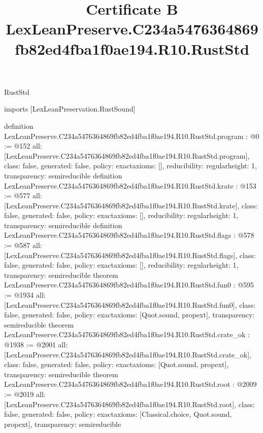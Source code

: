 \begin{lexlean}{RustStd}
\title{Certificate B LexLeanPreserve.C234a5476364869fb82ed4fba1f0ae194.R10.RustStd}
\begin{coremodule}
imports [LexLeanPreservation.RustSound]

definition LexLeanPreserve.C234a5476364869fb82ed4fba1f0ae194.R10.RustStd.program : @0 := @152 {
  all: [LexLeanPreserve.C234a5476364869fb82ed4fba1f0ae194.R10.RustStd.program],
  class: false,
  generated: false,
  policy: exact{axioms: []},
  reducibility: regular{height: 1},
  transparency: semireducible
}
definition LexLeanPreserve.C234a5476364869fb82ed4fba1f0ae194.R10.RustStd.krate : @153 := @577 {
  all: [LexLeanPreserve.C234a5476364869fb82ed4fba1f0ae194.R10.RustStd.krate],
  class: false,
  generated: false,
  policy: exact{axioms: []},
  reducibility: regular{height: 1},
  transparency: semireducible
}
definition LexLeanPreserve.C234a5476364869fb82ed4fba1f0ae194.R10.RustStd.flags : @578 := @587 {
  all: [LexLeanPreserve.C234a5476364869fb82ed4fba1f0ae194.R10.RustStd.flags],
  class: false,
  generated: false,
  policy: exact{axioms: []},
  reducibility: regular{height: 1},
  transparency: semireducible
}
theorem LexLeanPreserve.C234a5476364869fb82ed4fba1f0ae194.R10.RustStd.fun0 : @595 := @1934 {
  all: [LexLeanPreserve.C234a5476364869fb82ed4fba1f0ae194.R10.RustStd.fun0],
  class: false,
  generated: false,
  policy: exact{axioms: [Quot.sound, propext]},
  transparency: semireducible
}
theorem LexLeanPreserve.C234a5476364869fb82ed4fba1f0ae194.R10.RustStd.crate_ok : @1938 := @2001 {
  all: [LexLeanPreserve.C234a5476364869fb82ed4fba1f0ae194.R10.RustStd.crate_ok],
  class: false,
  generated: false,
  policy: exact{axioms: [Quot.sound, propext]},
  transparency: semireducible
}
theorem LexLeanPreserve.C234a5476364869fb82ed4fba1f0ae194.R10.RustStd.root : @2009 := @2019 {
  all: [LexLeanPreserve.C234a5476364869fb82ed4fba1f0ae194.R10.RustStd.root],
  class: false,
  generated: false,
  policy: exact{axioms: [Classical.choice, Quot.sound, propext]},
  transparency: semireducible
}


\end{coremodule}
\end{lexlean}
